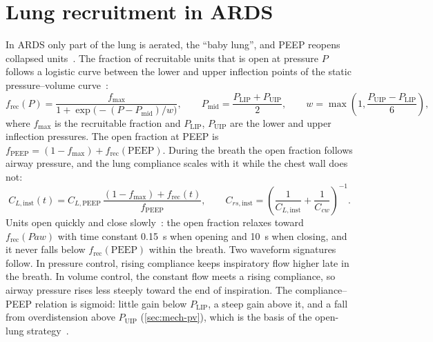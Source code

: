 \section{Lung recruitment in ARDS}
\label{sec:mech-recruit}
In ARDS only part of the lung is aerated, the ``baby lung'', and PEEP reopens collapsed units~\citep{gattinoni2005a}. The fraction of recruitable units that is open at pressure $P$ follows a logistic curve between the lower and upper inflection points of the static pressure--volume curve~\citep{villar2006,nuckton2002}:
\begin{equation}
f_{\mathrm{rec}}(P)=\frac{f_{\max}}{1+\exp\bigl(-(P-P_{\mathrm{mid}})/w\bigr)},\qquad
P_{\mathrm{mid}}=\frac{P_{\mathrm{LIP}}+P_{\mathrm{UIP}}}{2},\qquad
w=\max\!\left(1,\frac{P_{\mathrm{UIP}}-P_{\mathrm{LIP}}}{6}\right),
\label{eq:mech-rec}
\end{equation}
where $f_{\max}$ is the recruitable fraction and $P_{\mathrm{LIP}}$, $P_{\mathrm{UIP}}$ are the lower and upper inflection pressures. The open fraction at PEEP is $f_{\mathrm{PEEP}}=(1-f_{\max})+f_{\mathrm{rec}}(\mathrm{PEEP})$. During the breath the open fraction follows airway pressure, and the lung compliance scales with it while the chest wall does not:
\begin{equation}
C_{L,\mathrm{inst}}(t)=C_{L,\mathrm{PEEP}}\,\frac{(1-f_{\max})+f_{\mathrm{rec}}(t)}{f_{\mathrm{PEEP}}},\qquad
C_{rs,\mathrm{inst}}=\left(\frac{1}{C_{L,\mathrm{inst}}}+\frac{1}{C_{cw}}\right)^{-1}.
\label{eq:mech-recC}
\end{equation}
Units open quickly and close slowly~\citep{gattinoni2005a}: the open fraction relaxes toward $f_{\mathrm{rec}}(\mathit{Paw})$ with time constant \SI{0.15}{\second} when opening and \SI{10}{\second} when closing, and it never falls below $f_{\mathrm{rec}}(\mathrm{PEEP})$ within the breath. Two waveform signatures follow. In pressure control, rising compliance keeps inspiratory flow higher late in the breath. In volume control, the constant flow meets a rising compliance, so airway pressure rises less steeply toward the end of inspiration. The compliance--PEEP relation is sigmoid: little gain below $P_{\mathrm{LIP}}$, a steep gain above it, and a fall from overdistension above $P_{\mathrm{UIP}}$ (\cref{sec:mech-pv}), which is the basis of the open-lung strategy~\citep{villar2006}.

